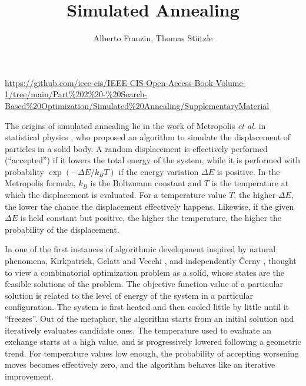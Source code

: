 \title{Simulated Annealing}
\label{chp:simulated-annealing}
\author{Alberto Franzin, Thomas St\"utzle}
\maketitle

\urldef\supplementurlsa\url{https://github.com/ieee-cis/IEEE-CIS-Open-Access-Book-Volume-1/tree/main/Part%202%20-%20Search-Based%20Optimization/Simulated%20Annealing/SupplementaryMaterial}

\newcommand{\initialtemperature}{\textsc{Initial Temperature}\xspace}
\newcommand{\stoppingcriterion}{\textsc{Stopping Criterion}\xspace}
\newcommand{\explorationcriterion}{\textsc{Neighbourhood Exploration}\xspace}
\newcommand{\acceptancecriterion}{\textsc{Acceptance Criterion}\xspace}
\newcommand{\temperaturelength}{\textsc{Temperature Length}\xspace}
\newcommand{\coolingscheme}{\textsc{Cooling Scheme}\xspace}
\newcommand{\temperaturerestart}{\textsc{Temperature Restart}\xspace}
\newcommand{\initialsolution}{\textsc{Initial Solution}\xspace}
\newcommand{\neighbourhood}{\textsc{Neighbourhood}\xspace}
\newcommand{\brsa}{\texttt{BR1}\xspace}
\newcommand{\qsa}{\texttt{Q8-7}\xspace}

\label{sec:introduction}

The origins of simulated annealing lie in the work of Metropolis 
\textit{et al.} in statistical physics \cite{MetRosRosTel53}, who proposed an algorithm to simulate the displacement of particles in
a solid body. A random displacement is effectively performed (``accepted'')
if it lowers the total energy of the system, while it is performed with 
probability $\exp{(-\Delta E / k_BT)}$ if the energy variation $\Delta E$ is
positive. In the Metropolis formula, $k_B$ is the Boltzmann constant and $T$
is the temperature at which the displacement is evaluated.
For a temperature value $T$, the higher $\Delta E$, the lower the chance
the displacement effectively happens. Likewise, if the given $\Delta E$ is held constant but positive,
the higher the temperature, the higher the probability of the displacement.

In one of the first
instances of algorithmic development inspired by natural phenomena, 
Kirkpatrick, Gelatt and Vecchi \cite{Kirkpatrick83},
and independently \v{C}erny \cite{Cer85}, thought to
view a combinatorial optimization problem as a solid, whose states are the
feasible solutions of the problem. The objective function value of
a particular solution is related to the level of energy of the system in
a particular configuration. The system is first heated
and then cooled little by little until it ``freezes''. 
Out of the metaphor, the algorithm starts from an initial solution
and iteratively evaluates candidate ones.
The temperature used to evaluate an exchange starts at a high value,
and is progressively lowered following a geometric trend. For temperature
values low enough, the probability of accepting worsening moves becomes
effectively zero, and the algorithm behaves like an iterative improvement.



